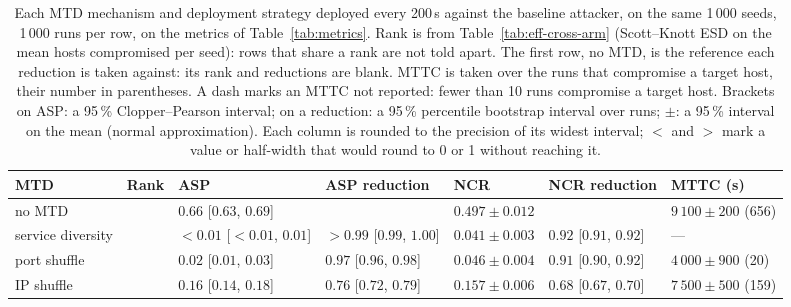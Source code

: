 \begin{table}[H]
  \centering
  \caption[Every metric for the baseline attacker, with 95\,\% intervals]{Each MTD mechanism and deployment strategy deployed every 200\,s against the baseline attacker, on the same 1\,000 seeds, 1\,000 runs per row, on the metrics of Table~\ref{tab:metrics}. Rank is from Table~\ref{tab:eff-cross-arm} (Scott--Knott ESD on the mean hosts compromised per seed): rows that share a rank are not told apart. The first row, no MTD, is the reference each reduction is taken against: its rank and reductions are blank. MTTC is taken over the runs that compromise a target host, their number in parentheses. A dash marks an MTTC not reported: fewer than 10 runs compromise a target host. Brackets on ASP: a 95\,\% Clopper--Pearson interval; on a reduction: a 95\,\% percentile bootstrap interval over runs; $\pm$: a 95\,\% interval on the mean (normal approximation). Each column is rounded to the precision of its widest interval; $<$ and $>$ mark a value or half-width that would round to 0 or 1 without reaching it.}
  \label{tab:full-baseline}
  \tablestyle
  \begin{tabular}{@{}P{4.7cm}>{\centering\arraybackslash}p{0.9cm}>{\centering\arraybackslash}p{4.0cm}>{\centering\arraybackslash}p{3.2cm}>{\centering\arraybackslash}p{2.6cm}>{\centering\arraybackslash}p{3.2cm}>{\centering\arraybackslash}p{3.2cm}@{}}
    \toprule
    MTD & Rank & ASP & ASP reduction & NCR & NCR reduction & MTTC (s) \\
    \midrule
    no MTD &  & $0.66$ [$0.63$, $0.69$] &  & $0.497 \pm 0.012$ &  & $9\,100 \pm 200$ (656) \\
    \midrule
    service diversity & 1 & ${<}0.01$ [${<}0.01$, $0.01$] & ${>}0.99$ [$0.99$, $1.00$] & $0.041 \pm 0.003$ & $0.92$ [$0.91$, $0.92$] & --- \\
    port shuffle & 1 & $0.02$ [$0.01$, $0.03$] & $0.97$ [$0.96$, $0.98$] & $0.046 \pm 0.004$ & $0.91$ [$0.90$, $0.92$] & $4\,000 \pm 900$ (20) \\
    IP shuffle & 2 & $0.16$ [$0.14$, $0.18$] & $0.76$ [$0.72$, $0.79$] & $0.157 \pm 0.006$ & $0.68$ [$0.67$, $0.70$] & $7\,500 \pm 500$ (159) \\

\end{tabular}
\end{table}
